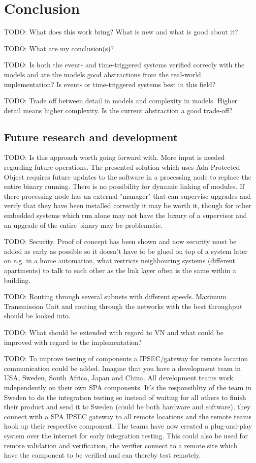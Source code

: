 \chapter{Conclusion}\label{ch:conclusion}
TODO: What does this work bring? What is new and what is good about it?

TODO: What are my conclusion(s)?

TODO: Is both the event- and time-triggered systems verified correcly with the
models and are the models good abstractions from the real-world implementation?
Is event- or time-triggered systems best in this field?

TODO: Trade off between detail in models and complexity in models. Higher
detail means higher complexity. Is the current abstraction a good trade-off?

\section{Future research and development}
TODO: Is this approach worth going forward with. More input is needed regarding
future operations. The presented solution which uses Ada Protected Object
requires future updates to the software in a processing node to replace the
entire binary running. There is no possibility for dynamic linking of modules.
If there processing node has an external "manager" that can supervise upgrades
and verify that they have been installed correctly it may be worth it, though
for other embedded systems which run alone may not have the luxury of a
supervisor and an upgrade of the entire binary may be problematic.

TODO: Security. Proof of concept has been shown and now security must be added
as early as possible so it doesn't have to be glued on top of a system later on
e.g. in a home automation, what restricts neighbouring systems (different
apartments) to talk to each other as the link layer often is the same within a
building.

TODO: Routing through several subnets with different speeds. Maximum
Transmission Unit and routing through the networks with the best throughput
should be looked into.

TODO: What should be extended with regard to VN and what could be improved with
regard to the implementation?

TODO: To improve testing of components a IPSEC/gateway for remote location
communication could be added. Imagine that you have a development team in USA,
Sweden, South Africa, Japan and China. All development teams work independently
on their own SPA components. It's the responsiblity of the team in Sweden to do
the integration testing so instead of waiting for all others to finish their
product and send it to Sweden (could be both hardware and software), they
connect with a SPA IPSEC gateway to all remote locations and the remote teams
hook up their respective component. The teams have now created a plug-and-play
system over the internet for early integration testing. This could also be used
for remote validation and verification, the verifier connect to a remote site
which have the component to be verified and can thereby test remotely.


